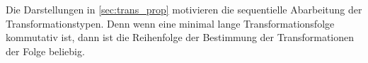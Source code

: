 Die Darstellungen in \autoref{sec:trans_prop} \textit{} motivieren die sequentielle Abarbeitung der Transformationstypen. Denn wenn eine minimal lange Transformationsfolge kommutativ ist, dann ist die Reihenfolge der Bestimmung der Transformationen der Folge beliebig.


